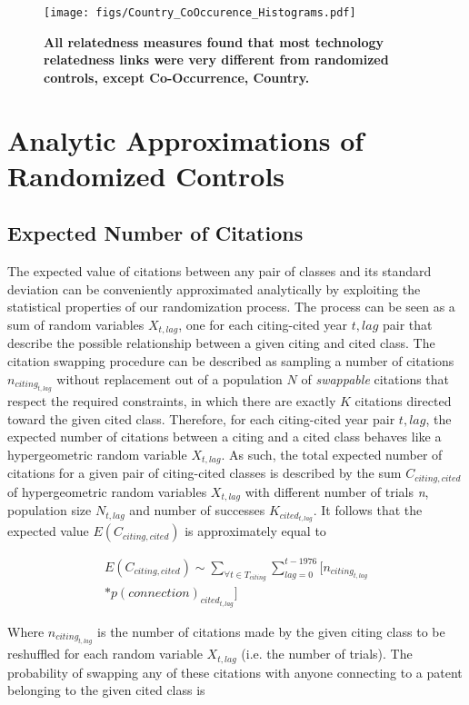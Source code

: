 \documentclass[pre,reprint,groupedaddress,superscriptaddress]{revtex4-1}
\begin{document}
\begin{figure}[h]
\centering
\texttt{[image: figs/Country\_CoOccurence\_Histograms.pdf]} 
\caption{\textbf{All relatedness measures found that most technology relatedness links were very different from randomized controls, except Co-Occurrence, Country.}}\label{p_value_histograms}
\end{figure}

\section{Analytic Approximations of Randomized Controls}
\subsection{Expected Number of Citations}
The expected value of citations between any pair of classes and its standard deviation can be conveniently approximated analytically by exploiting the statistical properties of our randomization process. The process can be seen as a sum of random variables $X_{t,lag}$, one for each citing-cited year ${t,lag}$ pair that describe the possible relationship between a given citing and cited class. The citation swapping procedure can be described as sampling a number of citations $n_{citing_{t,lag}}$ without replacement out of a population $N$ of \textit{swappable} citations that respect the required constraints, in which there are exactly $K$ citations directed toward the given cited class. Therefore, for each citing-cited year pair ${t,lag}$, the expected number of citations between a citing and a cited class behaves like a hypergeometric random variable $X_{t,lag}$. As such, the total expected number of citations for a given pair of citing-cited classes is described by the sum ${C_{citing,cited}}$ of hypergeometric random variables ${X_{t,lag}}$ with different number of trials \textit{n}, population size $N_{t,lag}$ and number of successes $K_{cited_{t,lag}}$. It follows that the expected value $E(C_{citing,cited})$ is approximately equal to

\begin{multline}
E(C_{citing,cited}) \sim \sum_{\forall t \in T_{citing}}\sum_{lag=0}^{t-1976} \bigl[ n_{citing_{t,lag}} \\
* p(connection)_{cited_{t,lag}} \bigr]
\end{multline}\label{expected_value_citation}

Where $n_{citing_{t,lag}}$ is the number of citations made by the given citing class to be reshuffled for each random variable $X_{t,lag}$ (i.e. the number of trials). The probability of swapping any of these citations with anyone connecting to a patent belonging to the given cited class is
\end{document}

